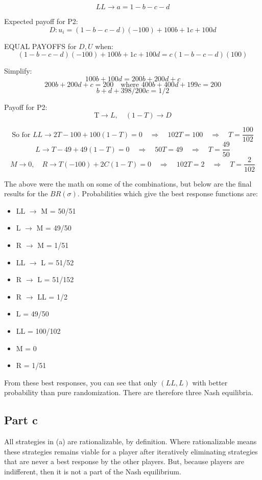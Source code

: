 \documentclass{article}
\begin{document}
\[
LL \to a = 1 - b - c - d
\]

Expected payoff for P2:
\[
D: u_i = (1 - b - c - d)(-100) + 100b + 1c + 100d
\]

EQUAL PAYOFFS for \( D, U \) when:
\[
(1 - b - c - d)(-100) + 100b + 1c + 100d = c(1 - b - c - d)(100)
\]

Simplify:
\[
100b + 100d = 200b + 200d + c
\]
\[
200b + 200d + c = 200 \quad \text{where } 400b + 400d + 199c = 200
\]
\[
b + d + 398/200c = 1/2 
\]

Payoff for P2:
\[
\text{T} \to L, \quad (1 - T) \to D
\]

\[
\text{So for } LL \to 2T - 100 + 100(1 - T) = 0 \quad \Rightarrow \quad 102T = 100 \quad \Rightarrow \quad T = \frac{100}{102}
\]
\[
L \to T - 49 + 49(1 - T) = 0 \quad \Rightarrow \quad 50T = 49 \quad \Rightarrow \quad T = \frac{49}{50}
\]
\[
M \to 0, \quad R \to T(-100) + 2C(1 - T) = 0 \quad \Rightarrow \quad 102T = 2 \quad \Rightarrow \quad T = \frac{2}{102}
\]

The above were the math on some of the combinations, but below are the final results for the $BR(\sigma)$. Probabilities which give the best response functions are: 
\begin{itemize}
    \item LL $\rightarrow$ M = 50/51
    \item L $\rightarrow$ M = 49/50
    \item R $\rightarrow$ M = 1/51
    \item LL $\rightarrow$ L = 51/52
    \item R $\rightarrow$ L = 51/152
    \item R $\rightarrow$ LL = 1/2
    \item L = 49/50
    \item LL = 100/102
    \item M = 0
    \item R = 1/51
\end{itemize}

From these best responses, you can see that only $(LL,L)$ with better probability than pure randomization. There are therefore three Nash equilibria. 

\subsection{Part c}
All strategies in (a) are rationalizable, by definition. Where rationalizable means these strategies remains viable for a player after iteratively eliminating strategies that are never a best response by the other players.  But, because players are indifferent, then it is not a part of the Nash equilibrium. 
\end{document}
